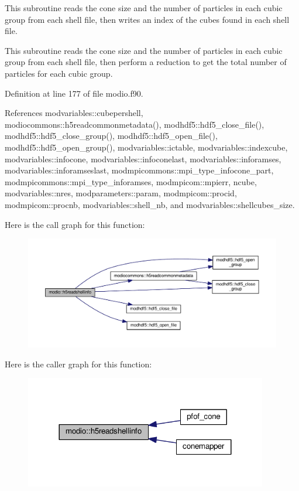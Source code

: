 This subroutine reads the cone size and the number of particles in each cubic group from each shell file, then writes an index of the cubes found in each shell file. 

This subroutine reads the cone size and the number of particles in each cubic group from each shell file, then perform a reduction to get the total number of particles for each cubic group. 

Definition at line 177 of file modio.\+f90.



References modvariables\+::cubepershell, modiocommons\+::h5readcommonmetadata(), modhdf5\+::hdf5\+\_\+close\+\_\+file(), modhdf5\+::hdf5\+\_\+close\+\_\+group(), modhdf5\+::hdf5\+\_\+open\+\_\+file(), modhdf5\+::hdf5\+\_\+open\+\_\+group(), modvariables\+::ictable, modvariables\+::indexcube, modvariables\+::infocone, modvariables\+::infoconelast, modvariables\+::inforamses, modvariables\+::inforamseslast, modmpicommons\+::mpi\+\_\+type\+\_\+infocone\+\_\+part, modmpicommons\+::mpi\+\_\+type\+\_\+inforamses, modmpicom\+::mpierr, ncube, modvariables\+::nres, modparameters\+::param, modmpicom\+::procid, modmpicom\+::procnb, modvariables\+::shell\+\_\+nb, and modvariables\+::shellcubes\+\_\+size.



Here is the call graph for this function\+:\nopagebreak
\begin{figure}[H]
\begin{center}
\leavevmode
\includegraphics[width=350pt]{namespacemodio_a5f1cc94eaee9d1f4f7bdca4cb63ee5bc_cgraph}
\end{center}
\end{figure}




Here is the caller graph for this function\+:\nopagebreak
\begin{figure}[H]
\begin{center}
\leavevmode
\includegraphics[width=300pt]{namespacemodio_a5f1cc94eaee9d1f4f7bdca4cb63ee5bc_icgraph}
\end{center}
\end{figure}


